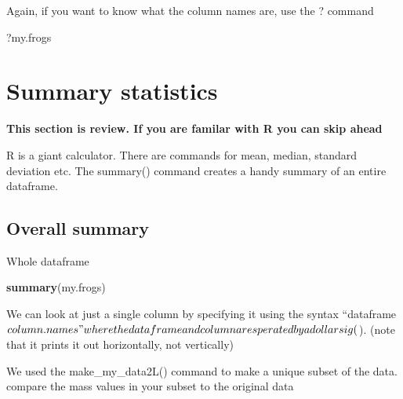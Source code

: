 \documentclass[]{book}
\newenvironment{Shaded}{\begin{snugshade}}{\end{snugshade}}
\newcommand{\KeywordTok}[1]{\textcolor[rgb]{0.13,0.29,0.53}{\textbf{#1}}}
\newcommand{\OperatorTok}[1]{\textcolor[rgb]{0.81,0.36,0.00}{\textbf{#1}}}
\newcommand{\NormalTok}[1]{#1}
\theoremstyle{definition}
\theoremstyle{definition}
\theoremstyle{definition}
\theoremstyle{remark}
\begin{document}
Again, if you want to know what the column names are, use the ? command

\begin{Shaded}
\begin{Highlighting}[]
\NormalTok{?my.frogs}
\end{Highlighting}
\end{Shaded}

\section{Summary statistics}\label{summary-statistics}

\textbf{This section is review. If you are familar with R you can skip
ahead}

R is a giant calculator. There are commands for mean, median, standard
deviation etc. The summary() command creates a handy summary of an
entire dataframe.

\subsection{Overall summary}\label{overall-summary}

Whole dataframe

\begin{Shaded}
\begin{Highlighting}[]
\KeywordTok{summary}\NormalTok{(my.frogs)}
\end{Highlighting}
\end{Shaded}

We can look at just a single column by specifying it using the syntax
``dataframe\(column.names" where the dataframe and column are sperated by a dollar sig (\)).
(note that it prints it out horizontally, not vertically)

\begin{Shaded}
\end{Shaded}

We used the make\_my\_data2L() command to make a unique subset of the
data. compare the mass values in your subset to the original data

\begin{Shaded}
\end{Shaded}
\end{document}
